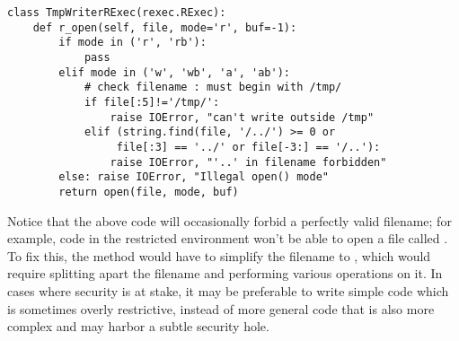 \begin{verbatim}
class TmpWriterRExec(rexec.RExec):
    def r_open(self, file, mode='r', buf=-1):
        if mode in ('r', 'rb'):
            pass
        elif mode in ('w', 'wb', 'a', 'ab'):
            # check filename : must begin with /tmp/
            if file[:5]!='/tmp/': 
                raise IOError, "can't write outside /tmp"
            elif (string.find(file, '/../') >= 0 or
                 file[:3] == '../' or file[-3:] == '/..'):
                raise IOError, "'..' in filename forbidden"
        else: raise IOError, "Illegal open() mode"
        return open(file, mode, buf)
\end{verbatim}
%
Notice that the above code will occasionally forbid a perfectly valid
filename; for example, code in the restricted environment won't be
able to open a file called .  To fix this, the
 method would have to simplify the filename to
, which would require splitting apart the filename and
performing various operations on it.  In cases where security is at
stake, it may be preferable to write simple code which is sometimes
overly restrictive, instead of more general code that is also more
complex and may harbor a subtle security hole.
